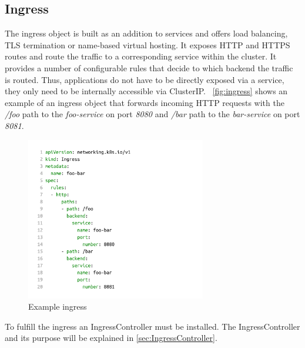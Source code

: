 \subsection{Ingress}\label{subsec:ingress}
The ingress object is built as an addition to services and offers load balancing, TLS termination or name-based virtual hosting.
It exposes HTTP and HTTPS routes and route the traffic to a corresponding service within the cluster.
It provides a number of configurable rules that decide to which backend the traffic is routed.
Thus, applications do not have to be directly exposed via a service, they only need to be internally accessible via ClusterIP.~\cite{KUBERNETES-INGRESS}
\autoref{fig:ingress} shows an example of an ingress object that forwards incoming HTTP requests with the \textit{/foo} path to the \textit{foo-service} on port \textit{8080} and \textit{/bar} path to the \textit{bar-service} on port \textit{8081}.

\begin{figure}[H]
    \centering
    \includegraphics[width=0.7\textwidth, left]{media/02/ingress}
    \caption{Example ingress}
    \label{fig:ingress}
\end{figure}

To fulfill the ingress an IngressController must be installed.
The IngressController and its purpose will be explained in \autoref{sec:IngressController}.

